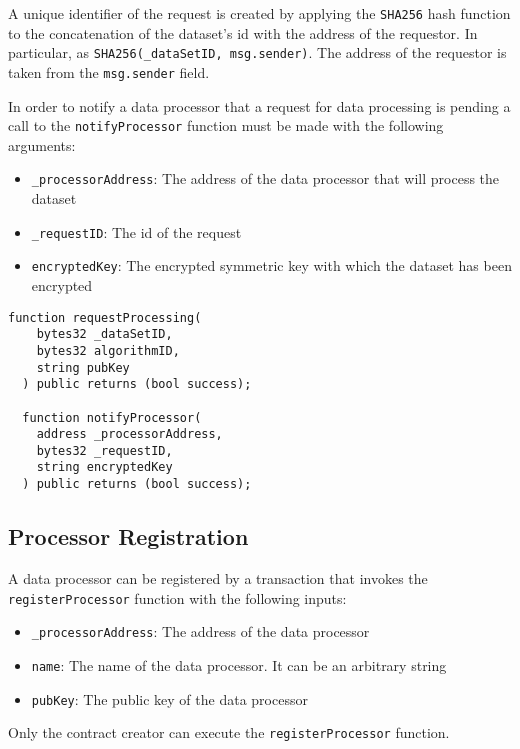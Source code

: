 A unique identifier of the request is created by applying the \verb|SHA256| hash function to the concatenation of the dataset's id with the address of the requestor. In particular, as \verb|SHA256(_dataSetID, msg.sender)|. The address of the requestor is taken from the \verb|msg.sender| field.

In order to notify a data processor that a request for data processing is pending a call to the \verb|notifyProcessor| function must be made with the following arguments:

\begin{itemize}
  \item \verb|_processorAddress|: The address of the data processor that will process the dataset
  \item \verb|_requestID|: The id of the request
  \item \verb|encryptedKey|: The encrypted symmetric key with which the dataset has been encrypted
\end{itemize}

\begin{lstlisting}[language=Solidity, caption={Request for processing functions}]
  function requestProcessing(
    bytes32 _dataSetID,
    bytes32 algorithmID,
    string pubKey
  ) public returns (bool success);

  function notifyProcessor(
    address _processorAddress,
    bytes32 _requestID,
    string encryptedKey
  ) public returns (bool success);

\end{lstlisting}

\subsection{Processor Registration}
\label{implemenation:contracts:reg_processor}

A data processor can be registered by a transaction that invokes the  \verb|registerProcessor| function with the following inputs:

\begin{itemize}
  \item \verb|_processorAddress|: The address of the data processor
  \item \verb|name|: The name of the data processor. It can be an arbitrary string
  \item \verb|pubKey|: The public key of the data processor
\end{itemize}

Only the contract creator can execute the \verb|registerProcessor| function.

